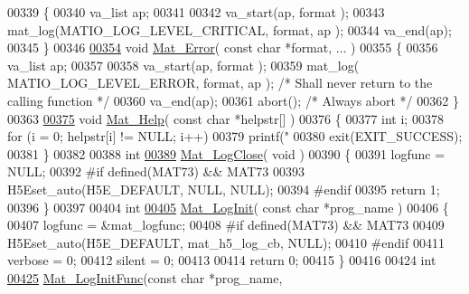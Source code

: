 \begin{DoxyCode}
{{{{{{{{{{{{{{00339 \{
00340     va\_list ap;
00341 
00342     va\_start(ap, format );
00343     mat\_log(MATIO\_LOG\_LEVEL\_CRITICAL, format, ap );
00344     va\_end(ap);
00345 \}
00346 
\hyperlink{group__mat__util_ga058b1cb9a4ca36712857d2b3c4de7ffc}{00354} \textcolor{keywordtype}{void} \hyperlink{group__mat__util_ga058b1cb9a4ca36712857d2b3c4de7ffc}{Mat\_Error}( \textcolor{keyword}{const} \textcolor{keywordtype}{char} *format, ... )
00355 \{
00356     va\_list ap;
00357 
00358     va\_start(ap, format );
00359     mat\_log( MATIO\_LOG\_LEVEL\_ERROR, format, ap ); \textcolor{comment}{/* Shall never return to the calling function */}
00360     va\_end(ap);
00361     abort(); \textcolor{comment}{/* Always abort */}
00362 \}
00363 
\hyperlink{group__mat__util_gaa4039c185e807ed2e9682b66fe2ea331}{00375} \textcolor{keywordtype}{void} \hyperlink{group__mat__util_gaa4039c185e807ed2e9682b66fe2ea331}{Mat\_Help}( \textcolor{keyword}{const} \textcolor{keywordtype}{char} *helpstr[] )
00376 \{
00377     \textcolor{keywordtype}{int} i;
00378     \textcolor{keywordflow}{for} (i = 0; helpstr[i] != NULL; i++)
00379         printf(\textcolor{stringliteral}{"%
00380     exit(EXIT\_SUCCESS);
00381 \}
00382 
00388 \textcolor{keywordtype}{int}
\hyperlink{group__mat__util_ga333d15dbd2e7a691621a2af8fc7adc3d}{00389} \hyperlink{group__mat__util_ga333d15dbd2e7a691621a2af8fc7adc3d}{Mat\_LogClose}( \textcolor{keywordtype}{void} )
00390 \{
00391     logfunc = NULL;
00392 \textcolor{preprocessor}{#if defined(MAT73) && MAT73}
00393     H5Eset\_auto(H5E\_DEFAULT, NULL, NULL);
00394 \textcolor{preprocessor}{#endif}
00395     \textcolor{keywordflow}{return} 1;
00396 \}
00397 
00404 \textcolor{keywordtype}{int}
\hyperlink{group__mat__util_ga0d30e03216ceaab7c0a4ff878b26f89f}{00405} \hyperlink{group__mat__util_ga0d30e03216ceaab7c0a4ff878b26f89f}{Mat\_LogInit}( \textcolor{keyword}{const} \textcolor{keywordtype}{char} *prog\_name )
00406 \{
00407     logfunc = &mat\_logfunc;
00408 \textcolor{preprocessor}{#if defined(MAT73) && MAT73}
00409     H5Eset\_auto(H5E\_DEFAULT, mat\_h5\_log\_cb, NULL);
00410 \textcolor{preprocessor}{#endif}
00411     verbose = 0;
00412     silent  = 0;
00413 
00414     \textcolor{keywordflow}{return} 0;
00415 \}
00416 
00424 \textcolor{keywordtype}{int}
\hyperlink{group__mat__util_ga93f4dd8d36413ae7f49260d757e3ab9f}{00425} \hyperlink{group__mat__util_ga93f4dd8d36413ae7f49260d757e3ab9f}{Mat\_LogInitFunc}(\textcolor{keyword}{const} \textcolor{keywordtype}{char} *prog\_name,
}}}}}}}}}}}}}}}
\end{DoxyCode}
